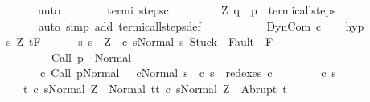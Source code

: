 \begin{isabellebody}
\ \ \ \ \ \ \ \ \isamarkupfalse%
\ auto\isanewline
\ \ \ \ \ \ \isamarkupfalse%
\ termi\ steps{\isacharunderscore}c{\isacharprime}\ \isanewline
\ \ \ \ \ \ \isamarkupfalse%
\ {\isachardoublequoteopen}{\isacharparenleft}{\isacharparenleft}Z{\isacharcomma}\ q{\isacharparenright}{\isacharcomma}\ {\isasymsigma}{\isacharcomma}\ p{\isacharparenright}\ {\isasymin}\ termi{\isacharunderscore}call{\isacharunderscore}steps\ {\isasymGamma}{\isachardoublequoteclose}\isanewline
\ \ \ \ \ \ \ \ \isamarkupfalse%
\ {\isacharparenleft}auto\ simp\ add{\isacharcolon}\ termi{\isacharunderscore}call{\isacharunderscore}steps{\isacharunderscore}def{\isacharparenright}\isanewline
\ \ \ \ \isamarkupfalse%
\isanewline
\ \ \isamarkupfalse%
\isanewline
{}\isamarkupfalse%
\isanewline
\ \ \isamarkupfalse%
\ {\isacharparenleft}DynCom\ c{\isacharparenright}\isanewline
\ \ \isamarkupfalse%
\ hyp{\isacharcolon}\ \isanewline
\ \ \ \ {\isachardoublequoteopen}{\isasymAnd}s{\isacharprime}{\isachardot}\ {\isasymforall}Z{\isachardot}\ {\isasymGamma}{\isacharcomma}{\isasymTheta}{\isasymturnstile}\isactrlsub t\isactrlbsub {\isacharslash}F\isactrlesub \isanewline
\ \ \ \ \ \ {\isacharbraceleft}s{\isachardot}\ s\ {\isacharequal}\ Z\ {\isasymand}\ {\isasymGamma}{\isasymturnstile}{\isasymlangle}c\ s{\isacharprime}{\isacharcomma}Normal\ s{\isasymrangle}\ {\isasymRightarrow}{\isasymnotin}{\isacharparenleft}{\isacharbraceleft}Stuck{\isacharbraceright}\ {\isasymunion}\ Fault\ {\isacharbackquote}\ {\isacharparenleft}{\isacharminus}F{\isacharparenright}{\isacharparenright}\ {\isasymand}\ \isanewline
\ \ \ \ \ \ \ \ \ \ \ \ {\isasymGamma}{\isasymturnstile}Call\ p\ {\isasymdown}\ Normal\ {\isasymsigma}\ {\isasymand}\isanewline
\ \ \ \ \ \ \ \ \ \ {\isacharparenleft}{\isasymexists}c{\isacharprime}{\isachardot}\ {\isasymGamma}{\isasymturnstile}{\isacharparenleft}Call\ p{\isacharcomma}Normal\ {\isasymsigma}{\isacharparenright}\ {\isasymrightarrow}\isactrlsup {\isacharplus}\ {\isacharparenleft}c{\isacharprime}{\isacharcomma}Normal\ s{\isacharparenright}\ {\isasymand}\ c\ s{\isacharprime}\ {\isasymin}\ redexes\ c{\isacharprime}{\isacharparenright}{\isacharbraceright}\isanewline
\ \ \ \ \ \ \ \ {\isacharparenleft}c\ s{\isacharprime}{\isacharparenright}\ \isanewline
\ \ \ \ \ \ \ {\isacharbraceleft}t{\isachardot}\ {\isasymGamma}{\isasymturnstile}{\isasymlangle}c\ s{\isacharprime}{\isacharcomma}Normal\ Z{\isasymrangle}\ {\isasymRightarrow}\ Normal\ t{\isacharbraceright}{\isacharcomma}{\isacharbraceleft}t{\isachardot}\ {\isasymGamma}{\isasymturnstile}{\isasymlangle}c\ s{\isacharprime}{\isacharcomma}Normal\ Z{\isasymrangle}\ {\isasymRightarrow}\ Abrupt\ t{\isacharbraceright}{\isachardoublequoteclose}\isanewline

\end{isabellebody}
